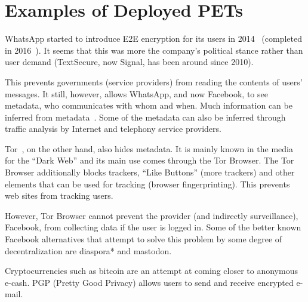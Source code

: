 





\section{Examples of Deployed \acp{PET}}

WhatsApp started to introduce \ac{E2E} encryption for its users in
2014~\cite{WhatsAppIntroducesE2Eencryption} (completed in
2016~\cite{WhatsAppE2Ecomplete}).  It seems that this was more the
company's political stance rather than user demand (TextSecure, now
Signal, has been around since 2010).

This prevents governments (\ie service providers) from reading the
contents of users' messages.  It still, however, allows WhatsApp, and
now Facebook, to see metadata, \ie who communicates with whom and
when. Much information can be inferred from
metadata~\cite{DevilInMetadata}.  Some of the metadata can also be
inferred through traffic analysis by \eg Internet and telephony
service providers.


Tor~\cite{Tor}, on the other hand, also hides metadata.
It is mainly known in the media for the \enquote{Dark Web}%
and its main use comes through the Tor Browser.%
The Tor Browser additionally blocks trackers, \enquote{Like Buttons} (\ie more 
trackers) and other elements that can be used for tracking (\eg browser 
fingerprinting).
This prevents web sites from tracking users.

However, Tor Browser cannot prevent the provider (and indirectly surveillance), \eg Facebook, 
from collecting data if the user is logged in. Some of the better
known Facebook alternatives that attempt to solve this problem by
some degree of decentralization are  diaspora*%
and mastodon. 

Cryptocurrencies such as bitcoin are an attempt at coming closer to
anonymous e-cash. PGP (Pretty Good Privacy) allows users to send and
receive encrypted e-mail.

